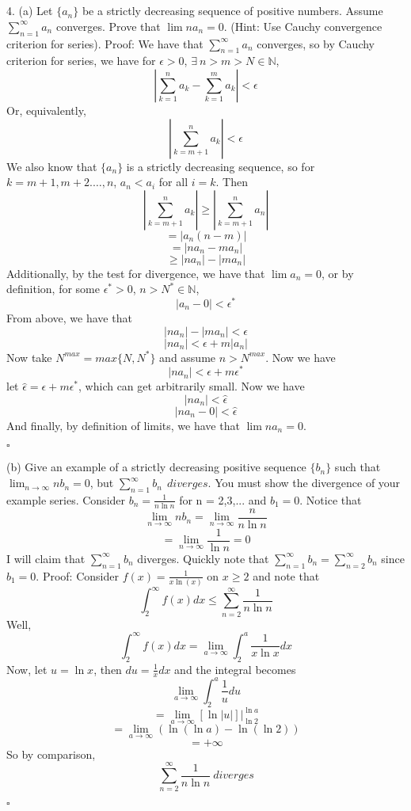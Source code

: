 \documentclass{article}
\begin{document}
\section{}
4. (a) Let $\{a_n\}$ be a strictly decreasing sequence of positive numbers. Assume $\sum_{n=1}^{\infty}a_n$ converges. Prove that $\lim na_n = 0$. (Hint: Use Cauchy convergence criterion for series).
\newline\newline
Proof: We have that $\sum_{n=1}^{\infty} a_n$ converges, so by Cauchy criterion for series, we have for $\epsilon > 0$, $\exists\: n>m>N \in \mathbb{N}$,
\[|\sum_{k=1}^n a_k - \sum_{k=1}^m a_k| < \epsilon\]
Or, equivalently,
\[|\sum_{k=m+1}^n a_k| < \epsilon\]
We also know that $\{a_n\}$ is a strictly decreasing sequence, so for $k = m+1, m+2. \ldots , n$, $a_n < a_i$ for all $i=k$. Then
\[|\sum_{k=m+1}^n a_k| \geq |\sum_{k=m+1}^n a_n |\]
\[= |a_n(n-m)|\]
\[=|n a_n - ma_n|\]
\[\geq |n a_n| - |ma_n|\]
Additionally, by the test for divergence, we have that $\lim a_n = 0$, or by definition, for some $\epsilon^* > 0$, $n > N^* \in \mathbb{N}$,
\[|a_n - 0| < \epsilon^*\]
From above, we have that
\[|n a_n| - |m a_n| < \epsilon\]
\[|n a_n| < \epsilon + m|a_n|\]
Now take $N^{max} = max\{N, N^*\}$ and assume $n > N^{max}$. Now we have
\[|n a_n| < \epsilon + m \epsilon^*\]
let $\hat{\epsilon} = \epsilon + m \epsilon^*$, which can get arbitrarily small. Now we have
\[|n a_n| < \hat{\epsilon}\]
\[|n a_n - 0| < \hat{\epsilon}\]
And finally, by definition of limits, we have that $\lim n a_n = 0$.
\begin{flushright}
    $\square$
\end{flushright}
(b) Give an example of a strictly decreasing positive sequence $\{b_n\}$ such that $\lim_{n \to \infty} n b_n = 0$, but $\sum_{n=1}^{\infty} b_n \:\: diverges$. You must show the divergence of your example series.
\newline\newline
Consider $b_n = \frac{1}{n\ln{n}}$ for n = 2,3,... and $b_1 = 0$.
Notice that 
\[\lim_{n \to \infty} n b_n = \lim_{n \to \infty} \frac{n}{n\ln{n}}\]
\[= \lim_{n \to \infty} \frac{1}{\ln{n}} = 0\]
I will claim that $\sum_{n=1}^{\infty} b_n$ diverges. Quickly note that $\sum_{n=1}^{\infty} b_n = \sum_{n=2}^{\infty} b_n$ since $b_1 = 0$.
\newline\newline
Proof: Consider $f(x) = \frac{1}{x\ln{(x)}}$ on $x \geq 2$ and note that
\[\int_2^{\infty} f(x) dx \leq \sum_{n=2}^{\infty} \frac{1}{n\ln{n}}\]
Well,
\[\int_2^{\infty}f(x)dx = \lim_{a \to \infty} \int_2^a \frac{1}{x\ln{x}}dx\]
Now, let $u = \ln{x}$, then $du = \frac{1}{x} dx$ and the integral becomes
\[\lim_{a \to \infty} \int_2^a \frac{1}{u} du\]
\[=\lim_{a \to \infty} [\ln{|u|}]|_{\ln{2}}^{\ln{a}}\]
\[=\lim_{a \to \infty}(\ln{(\ln{a})} - \ln{(\ln{2})})\]
\[ = + \infty\]
So by comparison, 
\[\sum_{n=2}^{\infty} \frac{1}{n\ln{n}} \: diverges\] 
\begin{flushright}
    $\square$
\end{flushright}
\end{document}

